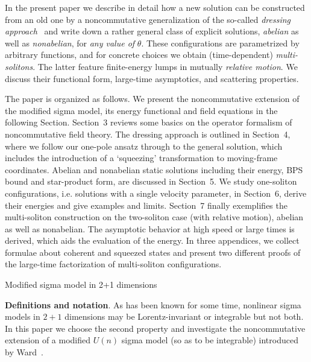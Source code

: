 \documentclass[a4paper,11pt]{article}
\makeatletter
\renewcommand{\section}{\@startsection{section}{1}{0pt}{\medskipamount}
{\medskipamount}{\large\bf}}
\numberwithin{equation}{section}
\def\th{\theta}
\makeatother
\begin{document}
In the present paper we describe in detail how a new solution can be
constructed from an old one by a noncommutative generalization of the so-called
{\it dressing approach\/}~\cite{zakharov,zakh2,forgacs}
and write down a rather general class of explicit solutions,
{\it abelian\/} as well as {\it nonabelian\/}, for {\it any value of\/} $\th$.
These configurations are parametrized by arbitrary functions, and for concrete
choices we obtain (time-dependent) {\it multi-solitons\/}.
The latter feature finite-energy lumps in mutually {\it relative motion\/}.
We discuss their functional form, large-time asymptotics,
and scattering properties.

The paper is organized as follows.
We present the noncommutative extension of the modified sigma model,
its energy functional and field equations in the following Section.
Section~3 reviews some basics on the operator formalism of noncommutative
field theory. The dressing approach is outlined in Section~4, where we
follow our one-pole ansatz through to the general solution, which includes
the introduction of a `squeezing' transformation to moving-frame coordinates.
Abelian and nonabelian static solutions including their energy, BPS bound and
star-product form, are discussed in Section~5. We study one-soliton
configurations, i.e. solutions with a single velocity parameter, in Section~6,
derive their energies and give examples and limits. Section~7 finally
exemplifies the multi-soliton construction on the two-soliton case (with
relative motion), abelian as well as nonabelian. The asymptotic behavior at
high speed or large times is derived, which aids the evaluation of the energy.
In three appendices, we collect formulae about coherent and squeezed states
and present two different proofs of the large-time factorization of
multi-soliton configurations.


\section{Modified sigma model in 2+1 dimensions}

\noindent
{\bf Definitions and notation}.
As has been known for some time, nonlinear sigma models in $2{+}1$ dimensions
may be Lorentz-invariant or integrable but not both.
In this paper we choose the second property and investigate the
noncommutative extension of a modified $U(n)$ sigma model
(so as to be integrable) introduced by Ward~\cite{ward}.
\end{document}
